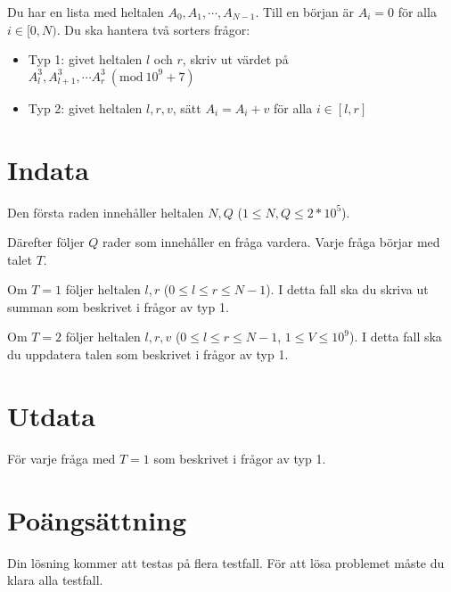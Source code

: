 \newcommand{\Mod}[1]{\ (\mathrm{mod}\ #1)}
Du har en lista med heltalen $A_0, A_1, \cdots, A_{N-1}$. Till en början är $A_i=0$ för alla $i \in [0,N)$.
Du ska hantera två sorters frågor:

\begin{itemize}
    \item Typ 1: givet heltalen $l$ och $r$, skriv ut värdet på  $A_l^3, A_{l+1}^3, \cdots A_{r}^3 \Mod{10^9+7}$
    \item Typ 2: givet heltalen $l,r,v$, sätt $A_i=A_i+v$ för alla $i \in [l,r]$
\end{itemize}


\section*{Indata}
Den första raden innehåller heltalen $N, Q$ ($1 \leq N, Q \leq 2*10^5$).

Därefter följer $Q$ rader som innehåller en fråga vardera. Varje fråga börjar med talet $T$.

Om $T=1$ följer heltalen $l, r$ ($0 \leq l \leq r \leq N - 1$). I detta fall ska du skriva ut summan som beskrivet i frågor av typ 1.

Om $T=2$ följer heltalen $l, r, v$ ($0 \leq l \leq r \leq N - 1$, $1 \leq V \leq 10^9$). I detta fall ska du uppdatera talen som beskrivet i frågor av typ 1.


\section*{Utdata}
För varje fråga med $T=1$ som beskrivet i frågor av typ 1.

\section*{Poängsättning}
Din lösning kommer att testas på flera testfall.
\noindent
För att lösa problemet måste du klara alla testfall.
